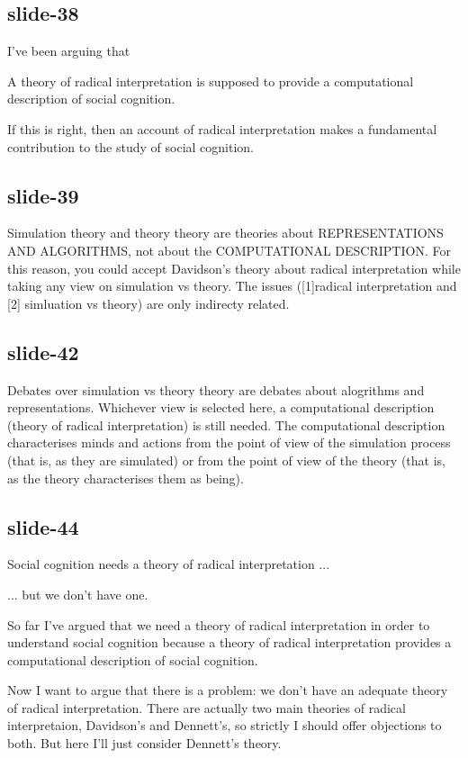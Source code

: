 \documentclass[12pt,\papersize]{extarticle}
\begin{document}
\subsection{slide-38}
I’ve been arguing that

A theory of radical interpretation is supposed to provide
a computational description of social cognition.

If this is right, then an account of radical interpretation makes a fundamental
contribution to the study of social cognition.

\subsection{slide-39}
Simulation theory and theory theory are theories about  REPRESENTATIONS AND
ALGORITHMS, not about the COMPUTATIONAL DESCRIPTION.
For this reason, you could accept Davidson’s theory about radical interpretation
while taking any view on simulation vs theory.  The issues ([1]radical interpretation
and [2] simluation vs theory) are only indirecty related.

\subsection{slide-42}
Debates over simulation vs theory theory are debates about alogrithms and representations.
Whichever view is selected here, a computational description (theory of radical
interpretation) is still needed. The computational description characterises minds and actions
from the point of view of the simulation process (that is, as they are simulated) or
from the point of view of the theory (that is, as the theory characterises them as being).

\subsection{slide-44}
Social cognition needs a theory of radical interpretation ...

... but we don’t have one.


So far I’ve argued that we need a theory of radical interpretation
in order to understand social cognition because a theory of radical
interpretation provides a computational description of social cognition.

Now I want to argue that there is a problem:
we don't have an adequate theory of radical interpretation.
There are actually two main theories of radical interpretaion,
Davidson’s and Dennett’s, so strictly I should offer objections to
both.  But here I’ll just consider Dennett’s theory.
\end{document}
